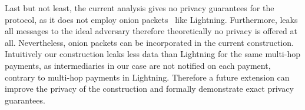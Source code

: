   Last but not least, the current analysis gives no privacy guarantees for the
  protocol, as it does not employ onion packets~\cite{sphinx} like Lightning.
  Furthermore, \fchan leaks all messages to the ideal adversary therefore
  theoretically no privacy is offered at all. Nevertheless, onion packets can be
  incorporated in the current construction. Intuitively our construction
  leaks less data than Lightning for the same multi-hop payments, as
  intermediaries in our case are not notified on each payment, contrary to
  multi-hop payments in Lightning. Therefore a future extension can improve the
  privacy of the construction and formally demonstrate exact privacy guarantees.

